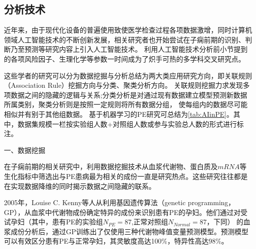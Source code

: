 \subsection{分析技术}
近年来，由于现代化设备的普遍使用致使医学检查过程各项数据激增，同时计算机领域人工智能技术的不断创新发展，相关研究者也开始尝试在子痫前期的识别、判断乃至预测等研究内容上引入人工智能技术。
利用人工智能技术分析前小节提到的各项风险因子、生理化学等参数一时间成为了炽手可热的多学科交叉研究点。

这些学者的研究可以分为数据挖掘与分析总结为两大类应用研究方向，即关联规则（Association Rule）挖掘方向与分类、聚类分析方向\cite{Mehta2016}。
关联规则挖掘力求发现多项数据之间的隐藏的逻辑与关系;分类分析是对通过现有数据建立模型预测新数据所属类别，聚类分析则是按照一定规则将所有数据分组，
使每组内的数据尽可能相似并有别于其他组数据\cite{Han2006}。
基于机器学习的PE研究可总结为\autoref{tab:AIinPE}。其中，数据集规模一栏按实验组人数+对照组人数或参与实验总人数的形式进行标注。

一、数据挖掘

在子痫前期的相关研究中，利用数据挖掘技术从血浆代谢物、蛋白质及$mRNA$等生化指标中筛选出与PE患病最为相关的成份一直是研究热点。这些研究往往都是在实现数据降维的同时揭示数据之间隐藏的联系。

2005年，Louise C. Kenny等人\cite{Kenny2005}从利用基因遗传算法（genetic programming，GP），从血浆中代谢物成份确定特异的成份来识别患有PE的孕妇。他们通过对受试孕妇（其中，患有PE的实验组$N_{PE}=87$,正常对照组$N_{Normal}=87$，下同）
的血浆成份分析后，通过GP训练出了仅使用三种代谢物峰值变量预测模型。预测模型可以有效区分患有PE与正常孕妇，其灵敏度高达100\%，特异性高达98\%。


